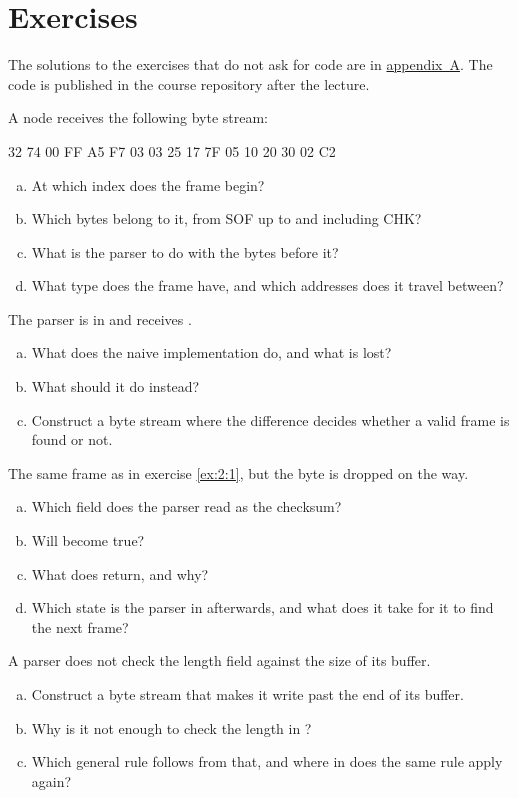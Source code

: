 \section*{Exercises}

The solutions to the exercises that do not ask for code are in
\hyperref[ch:losningar]{appendix~A}. The code is published in the course repository after the
lecture.

\label{ex:2:1}
A node receives the following byte stream:

\begin{console}
32 74 00 FF A5 F7 03 03 25 17 7F 05 10 20 30 02 C2
\end{console}

\begin{enumerate}[a)]
  \item At which index does the frame begin?
  \item Which bytes belong to it, from SOF up to and including CHK?
  \item What is the parser to do with the bytes before it?
  \item What type does the frame have, and which addresses does it travel between?
\end{enumerate}

\label{ex:2:2}
The parser is in  and receives .
\begin{enumerate}[a)]
  \item What does the naive implementation do, and what is lost?
  \item What should it do instead?
  \item Construct a byte stream where the difference decides whether a valid frame is found or
    not.
\end{enumerate}

\label{ex:2:3}
The same frame as in exercise \ref{ex:2:1}, but the byte  is dropped on the way.
\begin{enumerate}[a)]
  \item Which field does the parser read as the checksum?
  \item Will  become true?
  \item What does  return, and why?
  \item Which state is the parser in afterwards, and what does it take for it to find the next
    frame?
\end{enumerate}

\label{ex:2:4}
A parser does not check the length field against the size of its buffer.
\begin{enumerate}[a)]
  \item Construct a byte stream that makes it write past the end of its buffer.
  \item Why is it not enough to check the length in ?
  \item Which general rule follows from that, and where in  does the same rule
    apply again?
\end{enumerate}
